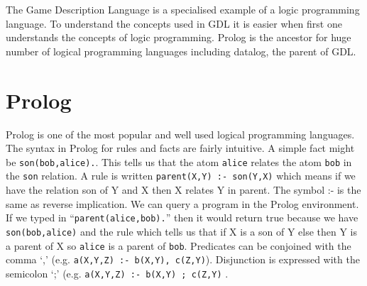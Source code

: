 The Game Description Language is a specialised example of a logic programming language. To understand the concepts used in GDL it is easier when first one understands the concepts of logic programming. Prolog is the ancestor for huge number of logical programming languages including datalog, the parent of GDL.

\section{Prolog}\label{sec:prolog}
Prolog is one of the most popular and well used logical programming languages. The syntax in Prolog for rules and facts are fairly intuitive. A simple fact might be \texttt{son(bob,alice).}. This tells us that the atom \texttt{alice} relates the atom \texttt{bob} in the \texttt{son} relation. A rule is written \texttt{parent(X,Y) :- son(Y,X)} which means if we have the relation son of Y and X then X relates Y in parent. The symbol :- is the same as reverse implication. We can query a program in the Prolog environment. If we typed in ``\texttt{parent(alice,bob).}'' then it would return true because we have \texttt{son(bob,alice)} and the rule which tells us that if X is a son of Y else then Y is a parent of X so \texttt{alice} is a parent of \texttt{bob}. Predicates can be conjoined with the comma `,' (e.g. \texttt{a(X,Y,Z) :- b(X,Y), c(Z,Y)}). Disjunction is expressed with the semicolon `;' (e.g. \texttt{a(X,Y,Z) :- b(X,Y) ; c(Z,Y)} \cite{Bratko}.

